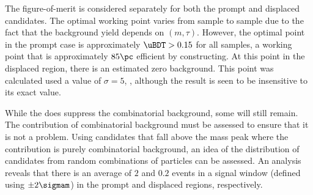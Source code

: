 The figure-of-merit is considered separately for both the prompt and displaced candidates.
The optimal working point varies from sample to sample due to the fact that the background yield
depends on $(m,\tau)$.
However, the optimal point in the prompt case is approximately $\uBDT>0.15$ for all samples, a
working point that
is approximately $85\pc$ efficient by constructing.
At this point in the displaced region, there is an estimated zero background.
This point was calculated used a value of $\sigma=5$, , although the result is seen
to be insensitive to its exact value.

While the \uBDT does suppress the combinatorial background, some will still remain.
The contribution of combinatorial background must be assessed to ensure that it is not a problem.
Using \Bp candidates that fall above the \Bd mass peak where the contribution is purely
combinatorial background, an idea of the distribution of \db candidates from random combinations of
particles can be assessed.
An analysis reveals that there is an average of \approx$2$ and \approx$0.2$ events in a signal
window (defined using $\pm2\sigmam$) in the prompt and displaced regions, respectively.




